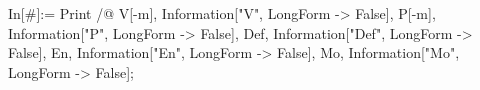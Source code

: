 In[\#]:= Print /@ {V[-m], Information["V", LongForm -> False], P[-m], Information["P", LongForm -> False], Def, Information["Def", LongForm -> False], En, Information["En", LongForm -> False], Mo, Information["Mo", LongForm -> False]}; 